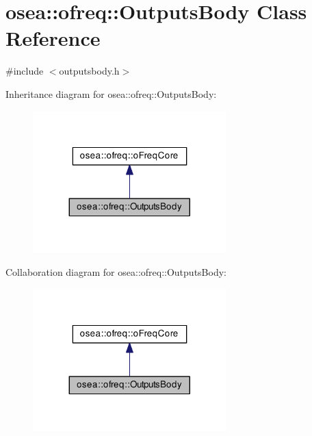 \hypertarget{classosea_1_1ofreq_1_1_outputs_body}{\section{osea\-:\-:ofreq\-:\-:Outputs\-Body Class Reference}
\label{classosea_1_1ofreq_1_1_outputs_body}
}


{\ttfamily \#include $<$outputsbody.\-h$>$}



Inheritance diagram for osea\-:\-:ofreq\-:\-:Outputs\-Body\-:\nopagebreak
\begin{figure}[H]
\begin{center}
\leavevmode
\includegraphics[width=212pt]{classosea_1_1ofreq_1_1_outputs_body__inherit__graph}
\end{center}
\end{figure}


Collaboration diagram for osea\-:\-:ofreq\-:\-:Outputs\-Body\-:\nopagebreak
\begin{figure}[H]
\begin{center}
\leavevmode
\includegraphics[width=212pt]{classosea_1_1ofreq_1_1_outputs_body__coll__graph}
\end{center}
\end{figure}
